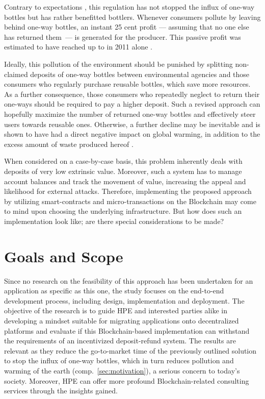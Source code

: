 Contrary to expectations  \cite[p.~10]{Hartlep2011Recycling}, this regulation has not stopped the influx of one-way bottles but has rather benefitted bottlers. Whenever consumers pollute by leaving behind one-way bottles, an instant 25 cent profit --- assuming that no one else has returned them~--- is generated for the producer. This passive profit was estimated to have reached up to  in 2011 alone \cite[p.~245]{PWC2011Mehrweg}. 

Ideally, this pollution of the environment should be punished by splitting non-claimed deposits of one-way bottles between environmental agencies and those consumers who regularly purchase reusable bottles, which save more resources. As a further consequence, those consumers who repeatedly neglect to return their one-ways should be required to pay a higher deposit. Such a revised approach can hopefully maximize the number of returned one-way bottles and effectively steer users towards reusable ones. Otherwise, a further decline may be inevitable and is shown to have had a direct negative impact on global warming, in addition to the excess amount of waste produced hereof \cite{DUHEinweg}.

When considered on a case-by-case basis, this problem inherently deals with deposits of very low extrinsic value. Moreover, such a system has to manage account balances and track the movement of value, increasing the appeal and likelihood for external attacks. Therefore, implementing the proposed approach by utilizing smart-contracts and micro-transactions on the Blockchain may come to mind upon choosing the underlying infrastructure. But how does such an implementation look like; are there special considerations to be made? 


\section{Goals and Scope}
\label{sec:goalsScope}
Since no research on the feasibility of this approach has been undertaken for an application as specific as this one, the study focuses on the end-to-end development process, including design, implementation and deployment. The objective of the research is to guide \ac{HPE} and interested parties alike in developing a mindset suitable for migrating applications onto decentralized platforms and evaluate if this Blockchain-based implementation can withstand the requirements of an incentivized deposit-refund system. The results are relevant as they reduce the go-to-market time of the previously outlined solution to stop the influx of one-way bottles, which in turn reduces pollution and warming of the earth (comp.~\ref{sec:motivation}), a serious concern to today's society. Moreover, \ac{HPE} can offer more profound Blockchain-related consulting services through the insights gained.


